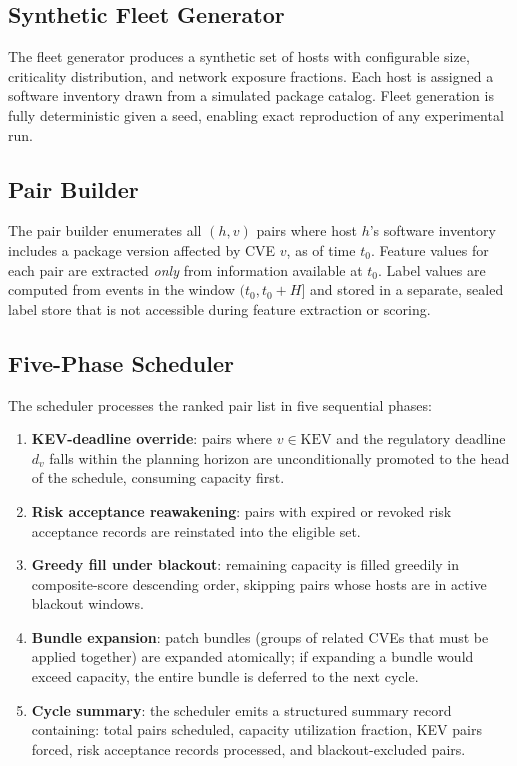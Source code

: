 \documentclass[journal]{IEEEtran}
\begin{document}
\subsection{Synthetic Fleet Generator}

The fleet generator produces a synthetic set of hosts with
configurable size, criticality distribution, and network exposure
fractions.  Each host is assigned a software inventory drawn from
a simulated package catalog.  Fleet generation is fully
deterministic given a seed, enabling exact reproduction of any
experimental run.

\subsection{Pair Builder}

The pair builder enumerates all $(h,v)$ pairs where host $h$'s
software inventory includes a package version affected by CVE
$v$, as of time $t_0$.  Feature values for each pair are
extracted \emph{only} from information available at $t_0$.
Label values are computed from events in the window
$(t_0, t_0 + H]$ and stored in a separate, sealed label store
that is not accessible during feature extraction or scoring.

\subsection{Five-Phase Scheduler}
\label{sec:scheduler}

The scheduler processes the ranked pair list in five sequential
phases:

\begin{enumerate}[leftmargin=*]
  \item \textbf{KEV-deadline override}: pairs where $v \in
    \text{KEV}$ and the regulatory deadline $d_v$ falls within
    the planning horizon are unconditionally promoted to the head
    of the schedule, consuming capacity first.

  \item \textbf{Risk acceptance reawakening}: pairs with expired
    or revoked risk acceptance records are reinstated into the
    eligible set.

  \item \textbf{Greedy fill under blackout}: remaining capacity
    is filled greedily in composite-score descending order,
    skipping pairs whose hosts are in active blackout windows.

  \item \textbf{Bundle expansion}: patch bundles (groups of
    related CVEs that must be applied together) are expanded
    atomically; if expanding a bundle would exceed capacity, the
    entire bundle is deferred to the next cycle.

  \item \textbf{Cycle summary}: the scheduler emits a structured
    summary record containing: total pairs scheduled, capacity
    utilization fraction, KEV pairs forced, risk acceptance
    records processed, and blackout-excluded pairs.
\end{enumerate}
\end{document}
